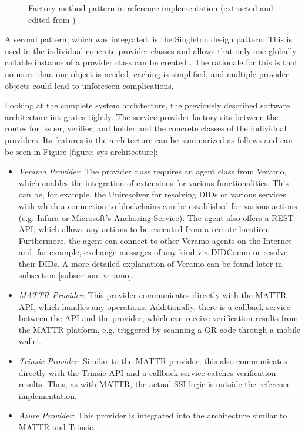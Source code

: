     \begin{figure}[ht]
	    \centering    	    \makebox[\textwidth]{}
        \caption{Factory method pattern in reference implementation (extracted and edited from \cite[p. 107]{gamma_design_1995})}
        \label{figure: factory method}
    \end{figure}
    
    A second pattern, which was integrated, is the Singleton design pattern. This is used in the individual concrete provider classes and allows that only one globally callable instance of a provider class can be created \cite[p. 127]{gamma_design_1995}. The rationale for this is that no more than one object is needed, caching is simplified, and multiple provider objects could lead to unforeseen complications.
    
    Looking at the complete system architecture, the previously described software architecture integrates tightly. The service provider factory sits between the routes for issuer, verifier, and holder and the concrete classes of the individual providers. Its features in the architecture can be summarized as follows and can be seen in Figure \ref{figure: sys architecture}:
    
    \begin{itemize}
        \item \textit{Veramo Provider}: The provider class requires an agent class from Veramo, which enables the integration of extensions for various functionalities. This can be, for example, the Uniresolver for resolving \acp{DID} or various services with which a connection to blockchains can be established for various actions (e.g. Infura or Microsoft's Anchoring Service). The agent also offers a REST API, which allows any actions to be executed from a remote location. Furthermore, the agent can connect to other Veramo agents on the Internet and, for example, exchange messages of any kind via DIDComm or resolve their \acp{DID}. A more detailed explanation of Veramo can be found later in subsection \ref{subsection: veramo}.
        \item \textit{MATTR Provider}: This provider communicates directly with the MATTR API, which handles any operations. Additionally, there is a callback service between the API and the provider, which can receive verification results from the MATTR platform, e.g. triggered by scanning a QR code through a mobile wallet.
        \item \textit{Trinsic Provider}: Similar to the MATTR provider, this also communicates directly with the Trinsic API and a callback service catches verification results. Thus, as with MATTR, the actual \ac{SSI} logic is outside the reference implementation.
        \item \textit{Azure Provider}: This provider is integrated into the architecture similar to MATTR and Trinsic. 
    \end{itemize}
    
